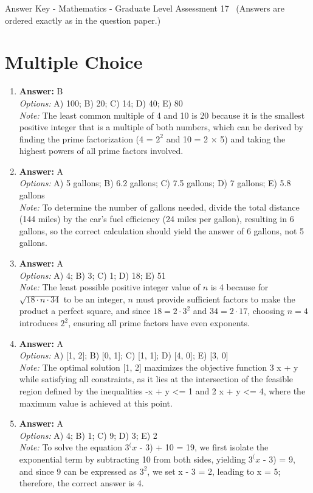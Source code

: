 \documentclass[12pt]{article}
\begin{document}
\begin{center}
Answer Key - Mathematics - Graduate Level Assessment 17 \
\small (Answers are ordered exactly as in the question paper.)
\end{center}

\section*{Multiple Choice}
\begin{enumerate}[label=\arabic*.]
\item \textbf{Answer:} B
\\ \textit{Options:} A) 100; B) 20; C) 14; D) 40; E) 80
\\ \textit{Note:} The least common multiple of 4 and 10 is 20 because it is the smallest positive integer that is a multiple of both numbers, which can be derived by finding the prime factorization (4 = $2^2$ and 10 = 2 × 5) and taking the highest powers of all prime factors involved.
\item \textbf{Answer:} A
\\ \textit{Options:} A) 5 gallons; B) 6.2 gallons; C) 7.5 gallons; D) 7 gallons; E) 5.8 gallons
\\ \textit{Note:} To determine the number of gallons needed, divide the total distance (144 miles) by the car's fuel efficiency (24 miles per gallon), resulting in 6 gallons, so the correct calculation should yield the answer of 6 gallons, not 5 gallons.
\item \textbf{Answer:} A
\\ \textit{Options:} A) 4; B) 3; C) 1; D) 18; E) 51
\\ \textit{Note:} The least possible positive integer value of \( n \) is 4 because for \( \sqrt{18 \cdot n \cdot 34} \) to be an integer, \( n \) must provide sufficient factors to make the product a perfect square, and since \( 18 = 2 \cdot 3^2 \) and \( 34 = 2 \cdot 17 \), choosing \( n = 4 \) introduces \( 2^2 \), ensuring all prime factors have even exponents.
\item \textbf{Answer:} A
\\ \textit{Options:} A) [1, 2]; B) [0, 1]; C) [1, 1]; D) [4, 0]; E) [3, 0]
\\ \textit{Note:} The optimal solution [1, 2] maximizes the objective function 3 x + y while satisfying all constraints, as it lies at the intersection of the feasible region defined by the inequalities -x + y \textless{}= 1 and 2 x + y \textless{}= 4, where the maximum value is achieved at this point.
\item \textbf{Answer:} A
\\ \textit{Options:} A) 4; B) 1; C) 9; D) 3; E) 2
\\ \textit{Note:} To solve the equation $3^(x$ - 3) + 10 = 19, we first isolate the exponential term by subtracting 10 from both sides, yielding $3^(x$ - 3) = 9, and since 9 can be expressed as $3^2$, we set x - 3 = 2, leading to x = 5; therefore, the correct answer is 4.
\end{enumerate}
\end{document}

